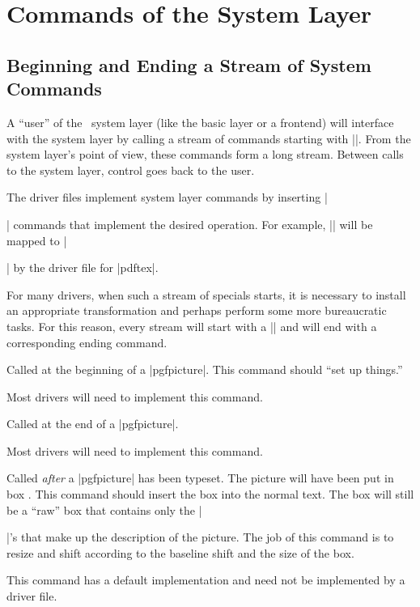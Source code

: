 %
%
%


\section{Commands of the System Layer}

\makeatletter

\subsection{Beginning and Ending a Stream of System Commands}

A ``user'' of the \pgfname\ system layer (like the basic layer or a
frontend) will interface with the system layer by calling a stream of
commands starting with |\pgfsys@|. From the system layer's point of
view, these commands form a long stream. Between calls to the system
layer, control goes back to the user.

The driver files implement system layer commands by inserting
|\special| commands that implement the desired operation. For example,
|\pgfsys@stroke| will be mapped to || by the driver
file for |pdftex|.

For many drivers, when such a stream of specials starts, it is
necessary to install an appropriate transformation and perhaps perform
some more bureaucratic tasks. For this reason, every stream will start
with a |\pgfsys@beginpicture| and will end with a corresponding ending
command.

\begin{command}{\pgfsys@beginpicture}
  Called at the beginning of a |{pgfpicture}|. This command should
  ``set up things.''

  Most drivers will need to implement this command.
\end{command}

\begin{command}{\pgfsys@endpicture}
  Called at the end of a |{pgfpicture}|.

  Most drivers will need to implement this command.
\end{command}

\begin{command}{\pgfsys@typesetpicturebox{}}
  Called \emph{after} a |{pgfpicture}| has been typeset. The picture
  will have been put in box . This command should insert the
  box into the normal text. The box  will still be a ``raw''
  box that contains only the |\special|'s that make up the description
  of the picture. The  job of this command is to resize and shift
   according to the  baseline shift and the size of the
  box.

  This command has a default implementation and need not be
  implemented by a driver file.
\end{command}

